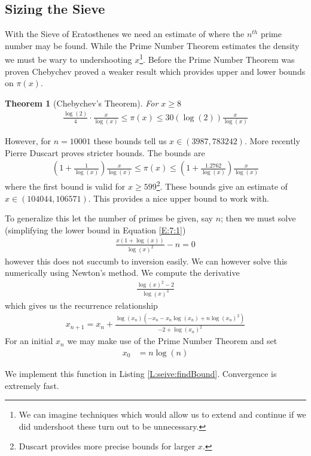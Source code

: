 \documentclass[oneside,12pt]{book}   	%
\newcounter{ex}
\newcounter{pr}
\newtheorem{thm}{Theorem}[chapter]
\theoremstyle{definition}
\begin{document}
\begin{spacing}{1.618}
			
		
		\section{Sizing the Sieve}
			With the Sieve of Eratosthenes we need an estimate of where the $n^{th}$ prime number may be found. While the Prime Number Theorem estimates the density we must be wary to undershooting $x$\footnote{We can imagine techniques which would allow us to extend and continue if we did undershoot these turn out to be unnecessary.}. Before the Prime Number Theorem was proven Chebychev proved a weaker result which provides upper and lower bounds on $\pi(x)$. 
			\begin{thm}[Chebychev's Theorem]\label{T:7:1}
				For $x\geq 8$
				\begin{alignat}{4}
					\frac{\log{(2)}}{4}\cdot \frac{x}{\log{(x)}} \leq \pi(x) \leq 30(\log{(2)})\frac{x}{\log{(x)}}
				\end{alignat}
			\end{thm}
			However, for $n=10001$ these bounds tell us $x\in(3987, 783242)$. More recently Pierre Duscart proves stricter bounds\cite{Duscart1998}. The bounds are
			\begin{alignat}{4}
				\left(1+\frac{1}{\log{(x)}}\right)\frac{x}{\log{(x)}} \leq \pi(x)\leq\left(1+\frac{1.2762}{\log{(x)}}\right)\frac{x}{\log{(x)}} \label{E:7:1}
			\end{alignat}
			where the first bound is valid for $x\geq 599$\footnote{Duscart provides more precise bounds for larger $x$.}. These bounds give an estimate of $x\in(104044, 106571)$. This provides a nice upper bound to work with. 
			
			To generalize this let the number of primes be given, say $n$; then we must solve (simplifying the lower bound in Equation \ref{E:7:1})
			\begin{alignat}{4}
				\frac{x(1+\log{(x)})}{\log{(x)}^2}-n=0
			\end{alignat}
			however this does not succumb to inversion easily. We can however solve this numerically using Newton's method. We compute the derivative
			\begin{alignat}{4}
				\frac{\log{(x)}^2-2}{\log{(x)}^3}
			\end{alignat}
			which gives us the recurrence relationship 
			\begin{alignat}{4}
				x_{n+1}=x_n+\frac{\log{(x_n)}\left(-x_n-x_n\log{(x_n)}+n\log{(x_n)}^2\right)}{-2+\log{(x_n)}^2}
			\end{alignat}
			For an initial $x_n$ we may make use of the Prime Number Theorem and set 
			\begin{alignat}{4}
				x_0&=n\log{(n)}
			\end{alignat}
			
			We implement this function in Listing \ref{L:seive:findBound}. Convergence is extremely fast.  
	

\end{spacing}
\end{document}
